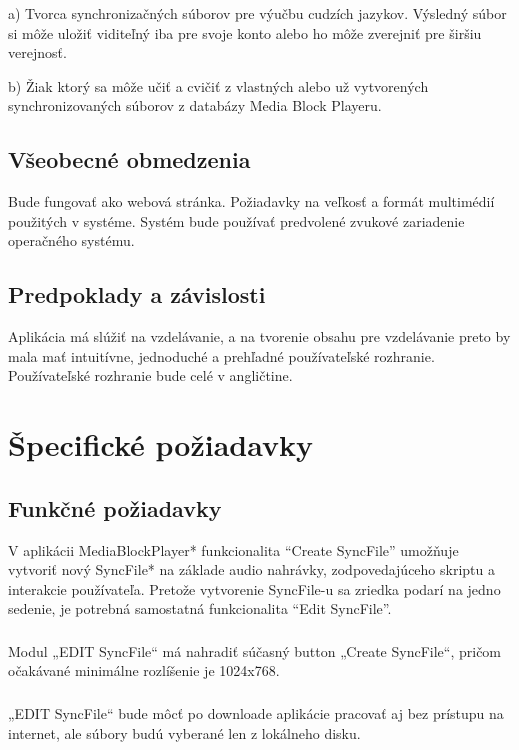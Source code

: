 \documentclass{article}
\begin{document}
a) Tvorca synchronizačných súborov pre výučbu cudzích jazykov. Výsledný súbor si môže uložiť viditeľný iba pre svoje konto alebo ho môže zverejniť pre širšiu verejnosť.

b) Žiak ktorý sa môže učiť a cvičiť z vlastných alebo už vytvorených synchronizovaných súborov z databázy Media Block Playeru.


\subsection{Všeobecné obmedzenia}
Bude fungovať ako webová stránka. Požiadavky na veľkosť a formát multimédií použitých v systéme. Systém bude používať predvolené zvukové zariadenie operačného systému.

\subsection{Predpoklady a závislosti}
Aplikácia má slúžiť na vzdelávanie, a na tvorenie obsahu pre vzdelávanie preto by mala mať intuitívne, jednoduché a prehľadné používateľské rozhranie. Používateľské rozhranie bude celé v angličtine.



\section{Špecifické požiadavky}

\subsection{Funkčné požiadavky}
V aplikácii MediaBlockPlayer* funkcionalita ``Create SyncFile'' umožňuje vytvoriť nový SyncFile* na základe audio nahrávky, zodpovedajúceho skriptu a interakcie používateľa. Pretože vytvorenie SyncFile-u sa zriedka podarí na jedno sedenie, je potrebná samostatná funkcionalita ``Edit SyncFile''.

\subsubsection{}
Modul „EDIT SyncFile“ má nahradiť súčasný button „Create SyncFile“, pričom očakávané minimálne rozlíšenie je 1024x768.

\subsubsection{}
„EDIT SyncFile“ bude môcť po downloade aplikácie pracovať aj bez prístupu na internet, ale súbory budú vyberané len z lokálneho disku. 
\end{document}

